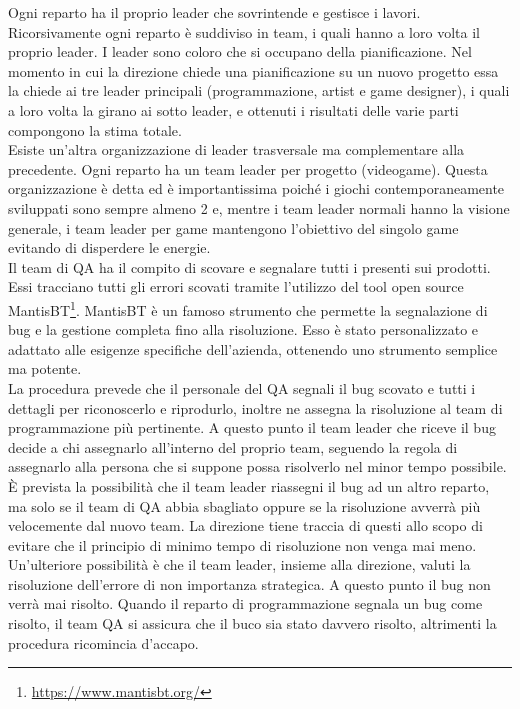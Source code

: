 Ogni reparto ha il proprio leader che sovrintende e gestisce i lavori. Ricorsivamente ogni reparto è suddiviso in team, i quali hanno a loro volta il proprio leader. I leader sono coloro che si occupano della pianificazione. Nel momento in cui la direzione chiede una pianificazione su un nuovo progetto essa la chiede ai tre leader principali (programmazione, artist e game designer), i quali a loro volta la girano ai sotto leader, e ottenuti i risultati delle varie parti compongono la stima totale.\\

Esiste un'altra organizzazione di leader trasversale ma complementare alla precedente. Ogni reparto ha un team leader per progetto (videogame). Questa organizzazione è detta  ed è importantissima poiché i giochi contemporaneamente sviluppati sono sempre almeno 2 e, mentre i team leader normali hanno la visione generale, i team leader per game mantengono l'obiettivo del singolo game evitando di disperdere le energie.\\

Il team di QA ha il compito di scovare e segnalare tutti i  presenti sui prodotti. Essi tracciano tutti gli errori scovati tramite l'utilizzo del tool open source MantisBT\footnote{\url{https://www.mantisbt.org/}}. MantisBT è un famoso strumento che permette la segnalazione di bug e la gestione completa fino alla risoluzione. Esso è stato personalizzato e adattato alle esigenze specifiche dell'azienda, ottenendo uno strumento semplice ma potente.\\

La procedura prevede che il personale del QA segnali il bug scovato e tutti i dettagli per riconoscerlo e riprodurlo, inoltre ne assegna la risoluzione al team di programmazione più pertinente. A questo punto il team leader che riceve il bug decide a chi assegnarlo all'interno del proprio team, seguendo la regola di assegnarlo alla persona che si suppone possa risolverlo nel minor tempo possibile. È prevista la possibilità che il team leader riassegni il bug ad un altro reparto, ma solo se il team di QA abbia sbagliato oppure se la risoluzione avverrà più velocemente dal nuovo team. La direzione tiene traccia di questi  allo scopo di evitare che il principio di minimo tempo di risoluzione non venga mai meno. Un'ulteriore possibilità è che il team leader, insieme alla direzione, valuti la risoluzione dell'errore di non importanza strategica. A questo punto il bug non verrà mai risolto. Quando il reparto di programmazione segnala un bug come risolto, il team QA si assicura che il buco sia stato davvero risolto, altrimenti la procedura ricomincia d'accapo.\\

